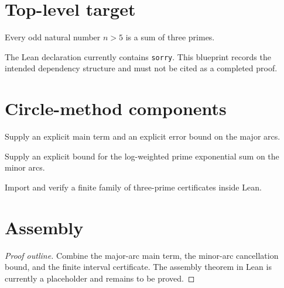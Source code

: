 \section{Top-level target}

\begin{theorem}
  \label{thm:ternary-goldbach}
  Every odd natural number $n > 5$ is a sum of three primes.
\end{theorem}

The Lean declaration currently contains \texttt{sorry}. This blueprint records
the intended dependency structure and must not be cited as a completed proof.

\section{Circle-method components}

\begin{lemma}
  \label{lem:major-arc-estimate}
  Supply an explicit main term and an explicit error bound on the major arcs.
\end{lemma}

\begin{lemma}
  \label{lem:minor-arc-estimate}
  Supply an explicit bound for the log-weighted prime exponential sum on the
  minor arcs.
\end{lemma}

\begin{lemma}
  \label{lem:finite-interval-certificate}
  Import and verify a finite family of three-prime certificates inside Lean.
\end{lemma}

\section{Assembly}

\begin{proof}[Proof outline]
  Combine the major-arc main term, the minor-arc cancellation bound, and the
  finite interval certificate. The assembly theorem in Lean is currently a
  placeholder and remains to be proved.
\end{proof}
